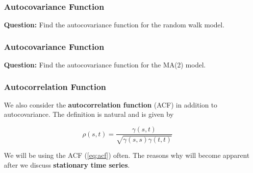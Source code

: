\documentclass[%
xcolor=pdftex]{beamer}
\begin{document}
\begin{frame}
\frametitle{Autocovariance Function}


{\bf Question:} Find the autocovariance function for the random
walk model.
\vspace{50mm}

\end{frame}

\begin{frame}
\frametitle{Autocovariance Function}

\textbf{Question:} Find the autocovariance function for the MA(2) model.
\vspace{50mm}

\end{frame}

\begin{frame}
\frametitle{Autocorrelation Function}


We also consider the \textbf{autocorrelation function} (ACF) in addition to autocovariance.  The definition is natural and is given by

\begin{equation} \label{eq:acf}
\rho(s,t)=\frac{\gamma(s,t)}{\sqrt{\gamma(s,s) \gamma(t,t)}}
\end{equation}

We will be using the ACF (\ref{eq:acf}) often. The reasons why will become apparent after we discuss \textbf{stationary time series}.

\end{frame}
\end{document}
